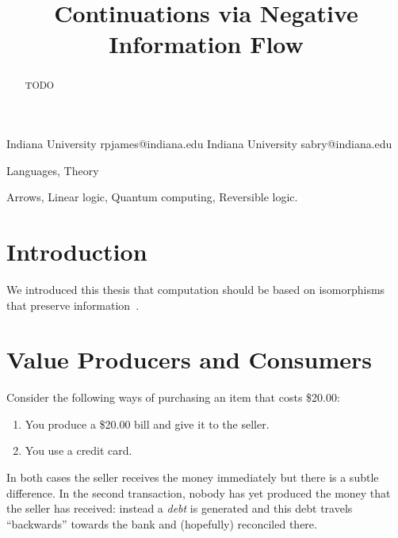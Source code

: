 \documentclass[preprint]{sigplanconf}
\begin{document}
\CopyrightYear{}
\copyrightdata{}
\titlebanner{}
\preprintfooter{}

\title{Continuations via Negative Information Flow}
           {Indiana University}
           {rpjames@indiana.edu}
           {Indiana University}
           {sabry@indiana.edu}
\maketitle

\begin{abstract}
TODO
\end{abstract}


\terms
Languages, Theory

\keywords Arrows, Linear logic, Quantum computing, Reversible logic.

\section{Introduction}

We introduced this thesis that computation should be based on isomorphisms
that preserve information~\cite{infeffects}.

\section{Value Producers and Consumers}

Consider the following ways of purchasing an item that costs \$20.00:

\begin{enumerate}
\item You produce a \$20.00 bill and give it to the seller.
\item You use a credit card. 
\end{enumerate}
In both cases the seller receives the money immediately but there is a subtle
difference. In the second transaction, nobody has yet produced the money that
the seller has received: instead a \emph{debt} is generated and this debt
travels ``backwards'' towards the bank and (hopefully) reconciled there.
\end{document}
